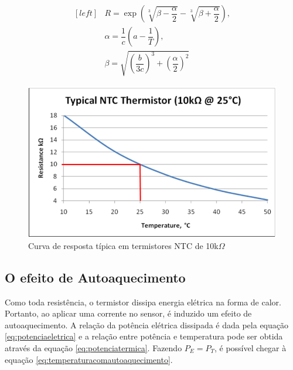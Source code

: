 		
		\begin{equation}\label{eq:steinharthartinverted}
			\begin{aligned} [left]
			& R = \exp{(\sqrt[3]{\beta - \dfrac{\alpha}{2}} - \sqrt[3]{\beta + \dfrac{\alpha}{2}})},
			\\
			& \alpha = \dfrac{1}{c}(a - \dfrac{1}{T}),
			\\
			& \beta = \sqrt{(\dfrac{b}{3c})^3 + (\dfrac{\alpha}{2})^2}
			\end{aligned}
		\end{equation}
	
	
		\begin{figure}[h!]
			\begin{center}
				\includegraphics[width=1\linewidth]{images/curva_termistor.png}
				\caption[Curva de resposta típica em termistores NTC de 10k$\Omega$]{Curva de resposta típica em termistores NTC de 10k$\Omega$\footnotemark}
				\label{fig:curva_termistor}
			\end{center}
		\end{figure}
	


	\subsection{O efeito de Autoaquecimento}

		Como toda resistência, o termistor dissipa energia elétrica na forma de calor. Portanto, ao aplicar uma corrente no sensor, é induzido um efeito de autoaquecimento. A relação da potência elétrica dissipada é dada pela equação \ref{eq:potenciaeletrica} e a relação entre potência e temperatura pode ser obtida através da equação \ref{eq:potenciatermica}. Fazendo $P_E = P_T$, é possível chegar à equação \ref{eq:temperaturacomautoaquecimento}. 
		
